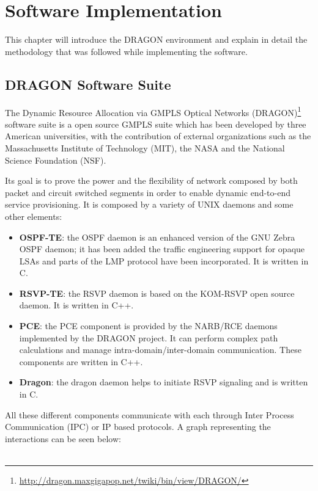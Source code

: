 \documentclass[10pt,a4paper]{report}
\begin{document}
\chapter{Software Implementation}\label{sec:softimpl}

This chapter will introduce the DRAGON environment and explain in
detail the methodology that was followed while implementing the
software.

\section{DRAGON Software Suite}

The Dynamic Resource Allocation via GMPLS Optical Networks
(DRAGON)\footnote{\url{http://dragon.maxgigapop.net/twiki/bin/view/DRAGON/}}
software suite is a open source GMPLS suite which has been developed
by three American universities, with the contribution of external
organizations such as the Massachusetts Institute of Technology (MIT),
the NASA and the National Science Foundation (NSF).

Its goal is to prove the power and the flexibility of network composed
by both packet and circuit switched segments in order to enable
dynamic end-to-end service provisioning. It is composed by a variety
of UNIX daemons and some other elements:

\begin{itemize}
\item \textbf{OSPF-TE}: the OSPF daemon is an enhanced version of the
  GNU Zebra OSPF daemon; it has been added the traffic engineering
  support for opaque LSAs and parts of the LMP protocol have been
  incorporated. It is written in C.
\item \textbf{RSVP-TE}: the RSVP daemon is based on the KOM-RSVP open
  source daemon. It is written in C++.
\item \textbf{PCE}: the PCE component is provided by the NARB/RCE
  daemons implemented by the DRAGON project. It can perform complex
  path calculations and manage intra-domain/inter-domain
  communication. These components are written in C++.
\item \textbf{Dragon}: the dragon daemon helps to initiate RSVP
  signaling and is written in C.
\end{itemize}

All these different components communicate with each through Inter
Process Communication (IPC) or IP based protocols. A graph
representing the interactions can be seen below:\\\\
\end{document}
